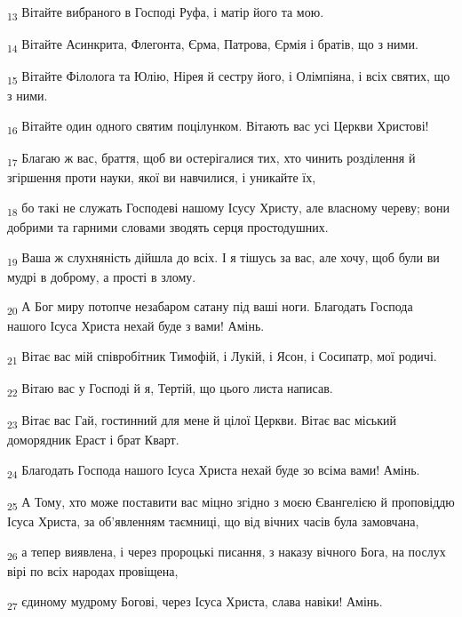 \begin{tcolorbox}
\textsubscript{13} Вітайте вибраного в Господі Руфа, і матір його та мою.
\end{tcolorbox}
\begin{tcolorbox}
\textsubscript{14} Вітайте Асинкрита, Флегонта, Єрма, Патрова, Єрмія і братів, що з ними.
\end{tcolorbox}
\begin{tcolorbox}
\textsubscript{15} Вітайте Філолога та Юлію, Нірея й сестру його, і Олімпіяна, і всіх святих, що з ними.
\end{tcolorbox}
\begin{tcolorbox}
\textsubscript{16} Вітайте один одного святим поцілунком. Вітають вас усі Церкви Христові!
\end{tcolorbox}
\begin{tcolorbox}
\textsubscript{17} Благаю ж вас, браття, щоб ви остерігалися тих, хто чинить розділення й згіршення проти науки, якої ви навчилися, і уникайте їх,
\end{tcolorbox}
\begin{tcolorbox}
\textsubscript{18} бо такі не служать Господеві нашому Ісусу Христу, але власному череву; вони добрими та гарними словами зводять серця простодушних.
\end{tcolorbox}
\begin{tcolorbox}
\textsubscript{19} Ваша ж слухняність дійшла до всіх. І я тішусь за вас, але хочу, щоб були ви мудрі в доброму, а прості в злому.
\end{tcolorbox}
\begin{tcolorbox}
\textsubscript{20} А Бог миру потопче незабаром сатану під ваші ноги. Благодать Господа нашого Ісуса Христа нехай буде з вами! Амінь.
\end{tcolorbox}
\begin{tcolorbox}
\textsubscript{21} Вітає вас мій співробітник Тимофій, і Лукій, і Ясон, і Сосипатр, мої родичі.
\end{tcolorbox}
\begin{tcolorbox}
\textsubscript{22} Вітаю вас у Господі й я, Тертій, що цього листа написав.
\end{tcolorbox}
\begin{tcolorbox}
\textsubscript{23} Вітає вас Гай, гостинний для мене й цілої Церкви. Вітає вас міський доморядник Ераст і брат Кварт.
\end{tcolorbox}
\begin{tcolorbox}
\textsubscript{24} Благодать Господа нашого Ісуса Христа нехай буде зо всіма вами! Амінь.
\end{tcolorbox}
\begin{tcolorbox}
\textsubscript{25} А Тому, хто може поставити вас міцно згідно з моєю Євангелією й проповіддю Ісуса Христа, за об'явленням таємниці, що від вічних часів була замовчана,
\end{tcolorbox}
\begin{tcolorbox}
\textsubscript{26} а тепер виявлена, і через пророцькі писання, з наказу вічного Бога, на послух вірі по всіх народах провіщена,
\end{tcolorbox}
\begin{tcolorbox}
\textsubscript{27} єдиному мудрому Богові, через Ісуса Христа, слава навіки! Амінь.
\end{tcolorbox}
